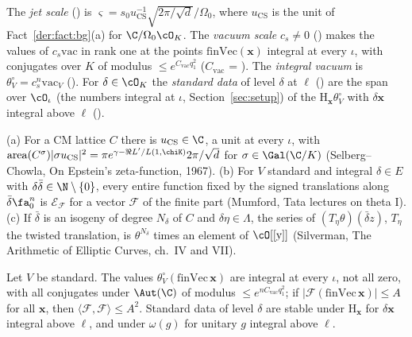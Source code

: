 \begin{definition}\label{der:def:std}
The \emph{jet scale} () is
$\varsigma=s_0u_{\mathrm{CS}}^{-1}\sqrt{2\pi/\sqrt d}/\Omega_0$, where $u_{\mathrm{CS}}$ is the unit
of Fact~\ref{der:fact:bg}(a) for $\C/\Omega_0\cO_K$. The \emph{vacuum scale} $c_s\ne0$
() makes the values of $c_s\mathrm{vac}$ in rank one at the points
$\mathrm{finVec}(\mathbf x)$ integral at every $\iota$, with conjugates over $K$ of modulus
$\le e^{C_{\mathrm{vac}}q_1^2}$ ($C_{\mathrm{vac}}$ = ). The
\emph{integral vacuum} is $\theta^\circ_V=c_s^n\mathrm{vac}_V$ (). For
$\delta\in\cO_K$ the \emph{standard data} of level $\delta$ at $\ell$ ()
are the span over $\cO_\iota$ (the numbers integral at $\iota$, Section~\ref{sec:setup}) of the
$\mathrm H_{\mathbf x}\theta^\circ_V$ with $\delta\mathbf x$ integral above $\ell$
().
\end{definition}

\begin{fact}\label{der:fact:bg}
(a) For a CM lattice $C$ there is $u_{\mathrm{CS}}\in\C$, a unit at every $\iota$, with
$\operatorname{area}(C^\sigma)|\sigma u_{\mathrm{CS}}|^2=\pi e^{\gamma-\Re L'/L(1,\chiK)}2\pi/\sqrt d$
for $\sigma\in\Gal(\C/K)$ (Selberg--Chowla, On Epstein's zeta-function, 1967). (b) For $V$ standard
and integral $\delta\in E$ with $\delta\bar\delta\in\N\setminus\{0\}$, every entire function fixed by
the signed translations along $\bar\delta\fa_0^n$ is $\mathcal E_{\mathcal F}$ for a vector
$\mathcal F$ of the finite part (Mumford, Tata lectures on theta I). (c) If $\bar\delta$ is an
isogeny of degree $N_\delta$ of $C$ and $\delta\eta\in\Lambda$, the series of
$(T_\eta\theta)(\bar\delta z)$, $T_\eta$ the twisted translation, is $\theta^{N_\delta}$ times an
element of $\cO[[\mathrm y]]$ (Silverman, The Arithmetic of Elliptic Curves, ch.~IV and VII).
\end{fact}

\begin{proposition}\label{der:prop:vacuum}
Let $V$ be standard. The values $\theta^\circ_V(\mathrm{finVec}\,\mathbf x)$ are integral at every
$\iota$, not all zero, with all conjugates under $\Aut(\C)$ of modulus $\le e^{nC_{\mathrm{vac}}
q_1^2}$; if $|\mathcal F(\mathrm{finVec}\,\mathbf x)|\le A$ for all $\mathbf x$, then
$\langle\mathcal F,\mathcal F\rangle\le A^2$. Standard data of level $\delta$ are stable under
$\mathrm H_{\mathbf x}$ for $\delta\mathbf x$ integral above $\ell$, and under $\omega(g)$ for unitary
$g$ integral above $\ell$.
\end{proposition}


